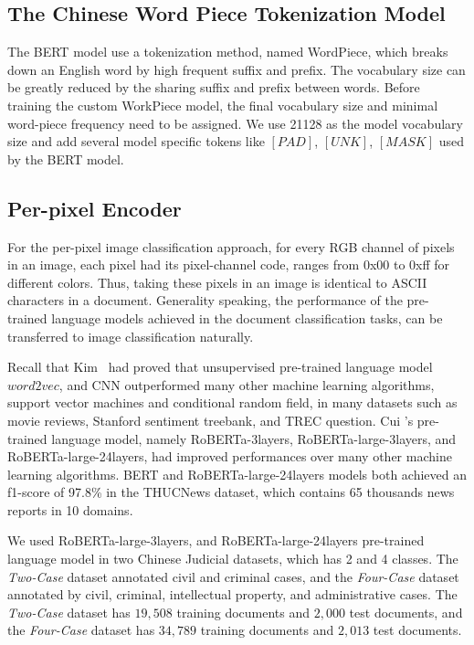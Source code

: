 \documentclass[10pt,twocolumn,letterpaper]{article}
\begin{document}
\subsection{The Chinese Word Piece Tokenization Model}

\par The BERT model use a tokenization method, named WordPiece, which breaks down an English word by high frequent suffix and prefix.
The vocabulary size can be greatly reduced by the sharing suffix and prefix between words.
Before training the custom WorkPiece model, the final vocabulary size and minimal word-piece frequency need to be assigned.
We use 21128 as the model vocabulary size and add several model specific tokens like $[PAD]$, $[UNK]$, $[MASK]$ used by the BERT model.


\subsection{Per-pixel Encoder}

For the per-pixel image classification approach, for every RGB channel of pixels in an image,
each pixel had its pixel-channel code, ranges from 0x00 to 0xff for different colors.
Thus, taking these pixels in an image is identical to ASCII characters in a document.
Generality speaking, the performance of the pre-trained language models achieved in the document classification tasks, can be transferred to image classification naturally.

Recall that Kim~\cite{kim2014convolutional} had proved that unsupervised pre-trained language model $word2vec$, and CNN outperformed many other machine learning algorithms,
\eg support vector machines and conditional random field, in many datasets such as movie reviews, Stanford sentiment treebank, and TREC question.
Cui \etal's pre-trained language model, namely RoBERTa-3layers, RoBERTa-large-3layers, and RoBERTa-large-24layers, had improved performances over many other machine learning algorithms.
BERT and RoBERTa-large-24layers models both achieved an f1-score of 97.8\% in the THUCNews dataset, which contains 65 thousands news reports in 10 domains.

We used RoBERTa-large-3layers, and RoBERTa-large-24layers pre-trained language model in two Chinese Judicial datasets, which has 2 and 4 classes.
The \textit{Two-Case} dataset annotated civil and criminal cases, and the \textit{Four-Case} dataset annotated by civil, criminal, intellectual property, and administrative cases.
The \textit{Two-Case} dataset has $19,508$ training documents and $2,000$ test documents, and the \textit{Four-Case} dataset has $34,789$ training documents and $2,013$ test documents.
\end{document}
